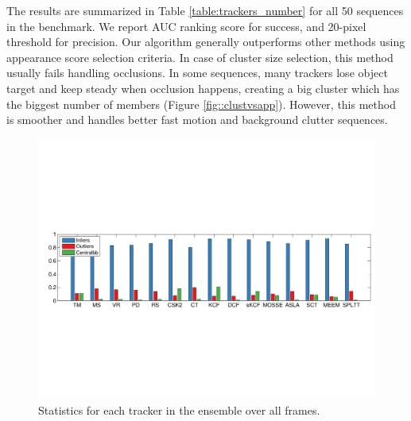 \begin{table}[h!]
\caption{\small Average AUC and precision for live fusion methods tested in 50 videos
		dataset.}
\label{table:trackers_number}
\end{table}

The results are summarized in Table \ref{table:trackers_number} for all 50
sequences in the benchmark.
We report AUC ranking score for success, 
and 20-pixel threshold for precision.
%
%
Our algorithm generally outperforms other methods using
appearance score selection criteria. In case of cluster size selection,
this method usually fails handling occlusions. In some sequences, many trackers
lose object target and keep steady when occlusion happens, creating a big
cluster which has the biggest number of members (Figure \ref{fig::clustvsapp}).
However, this method is smoother and handles better fast motion and background
clutter sequences.

\begin{figure}[h!]
\centering
\includegraphics[width=1.0\linewidth, trim= 0.7cm 7.6cm 0.3cm 7.8cm, clip=true]{Figures/stats.pdf}
\caption{\small Statistics for each tracker in the ensemble over all frames. }
\label{fig:stats}
\end{figure}

